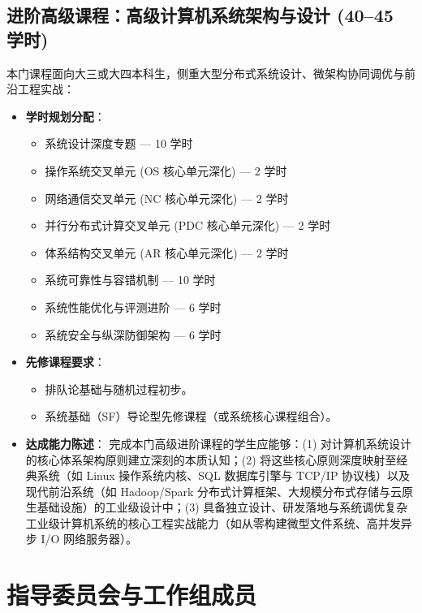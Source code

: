 \subsection{进阶高级课程：高级计算机系统架构与设计 (40--45 学时)}
本门课程面向大三或大四本科生，侧重大型分布式系统设计、微架构协同调优与前沿工程实战：
\begin{itemize}
    \item \textbf{学时规划分配}：
    \begin{itemize}
        \item 系统设计深度专题 --- 10 学时
        \item 操作系统交叉单元 (OS 核心单元深化) --- 2 学时
        \item 网络通信交叉单元 (NC 核心单元深化) --- 2 学时
        \item 并行分布式计算交叉单元 (PDC 核心单元深化) --- 2 学时
        \item 体系结构交叉单元 (AR 核心单元深化) --- 2 学时
        \item 系统可靠性与容错机制 --- 10 学时
        \item 系统性能优化与评测进阶 --- 6 学时
        \item 系统安全与纵深防御架构 --- 6 学时
    \end{itemize}
    \item \textbf{先修课程要求}：
    \begin{itemize}
        \item 排队论基础与随机过程初步。
        \item 系统基础（SF）导论型先修课程（或系统核心课程组合）。
    \end{itemize}
    \item \textbf{达成能力陈述}：
    完成本门高级进阶课程的学生应能够：(1) 对计算机系统设计的核心体系架构原则建立深刻的本质认知；(2) 将这些核心原则深度映射至经典系统（如 Linux 操作系统内核、SQL 数据库引擎与 TCP/IP 协议栈）以及现代前沿系统（如 Hadoop/Spark 分布式计算框架、大规模分布式存储与云原生基础设施）的工业级设计中；(3) 具备独立设计、研发落地与系统调优复杂工业级计算机系统的核心工程实战能力（如从零构建微型文件系统、高并发异步 I/O 网络服务器）。
\end{itemize}

\section{指导委员会与工作组成员}

